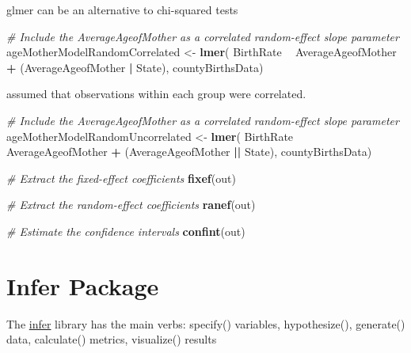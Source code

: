 \documentclass[]{book}
\newenvironment{Shaded}{\begin{snugshade}}{\end{snugshade}}
\newcommand{\KeywordTok}[1]{\textcolor[rgb]{0.13,0.29,0.53}{\textbf{#1}}}
\newcommand{\DataTypeTok}[1]{\textcolor[rgb]{0.13,0.29,0.53}{#1}}
\newcommand{\DecValTok}[1]{\textcolor[rgb]{0.00,0.00,0.81}{#1}}
\newcommand{\StringTok}[1]{\textcolor[rgb]{0.31,0.60,0.02}{#1}}
\newcommand{\CommentTok}[1]{\textcolor[rgb]{0.56,0.35,0.01}{\textit{#1}}}
\newcommand{\OperatorTok}[1]{\textcolor[rgb]{0.81,0.36,0.00}{\textbf{#1}}}
\newcommand{\NormalTok}[1]{#1}
\theoremstyle{definition}
\theoremstyle{definition}
\theoremstyle{definition}
\theoremstyle{remark}
\begin{document}
glmer can be an alternative to chi-squared tests

\begin{Shaded}
\begin{Highlighting}[]
\CommentTok{# Include the AverageAgeofMother as a correlated random-effect slope parameter}
\NormalTok{ageMotherModelRandomCorrelated <-}\StringTok{ }\KeywordTok{lmer}\NormalTok{( BirthRate }\OperatorTok{~}\StringTok{ }\NormalTok{AverageAgeofMother }\OperatorTok{+}\StringTok{ }\NormalTok{(AverageAgeofMother }\OperatorTok{|}\StringTok{ }\NormalTok{State),}
\NormalTok{                       countyBirthsData)}

\NormalTok{ assumed that observations within each group were correlated.}

\CommentTok{# Include the AverageAgeofMother as a correlated random-effect slope parameter}
\NormalTok{ageMotherModelRandomUncorrelated <-}\StringTok{ }\KeywordTok{lmer}\NormalTok{( BirthRate }\OperatorTok{~}\StringTok{ }\NormalTok{AverageAgeofMother }\OperatorTok{+}\StringTok{ }\NormalTok{(AverageAgeofMother }\OperatorTok{||}\StringTok{ }\NormalTok{State),}
\NormalTok{                       countyBirthsData)}


\CommentTok{# Extract the fixed-effect coefficients}
\KeywordTok{fixef}\NormalTok{(out)}

\CommentTok{# Extract the random-effect coefficients}
\KeywordTok{ranef}\NormalTok{(out)}

\CommentTok{# Estimate the confidence intervals }
\KeywordTok{confint}\NormalTok{(out)}
\end{Highlighting}
\end{Shaded}

\section{Infer Package}\label{infer-package}

The
\href{https://cran.r-project.org/web/packages/infer/infer.pdf}{infer}
library has the main verbs: specify() variables, hypothesize(),
generate() data, calculate() metrics, visualize() results

\begin{Shaded}
\end{Shaded}
\end{document}
